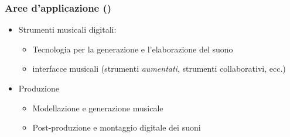 %
%
% 
% 
% 
%

\setcounter{ms}{0}
\begin{frame}
    \frametitle{Aree d'applicazione ()}

    \begin{itemize}
        \item{Strumenti musicali digitali:}
            \begin{itemize}
                \item{Tecnologia per la generazione e l'elaborazione del suono}
                \item{interfacce musicali (strumenti \emph{aumentati},
                    strumenti collaborativi, ecc.)}
            \end{itemize}
        \item{Produzione}
            \begin{itemize}
                \item{Modellazione e generazione musicale}
                \item{Post-produzione e montaggio digitale dei suoni}
            \end{itemize}
    \end{itemize}
    
\end{frame}

